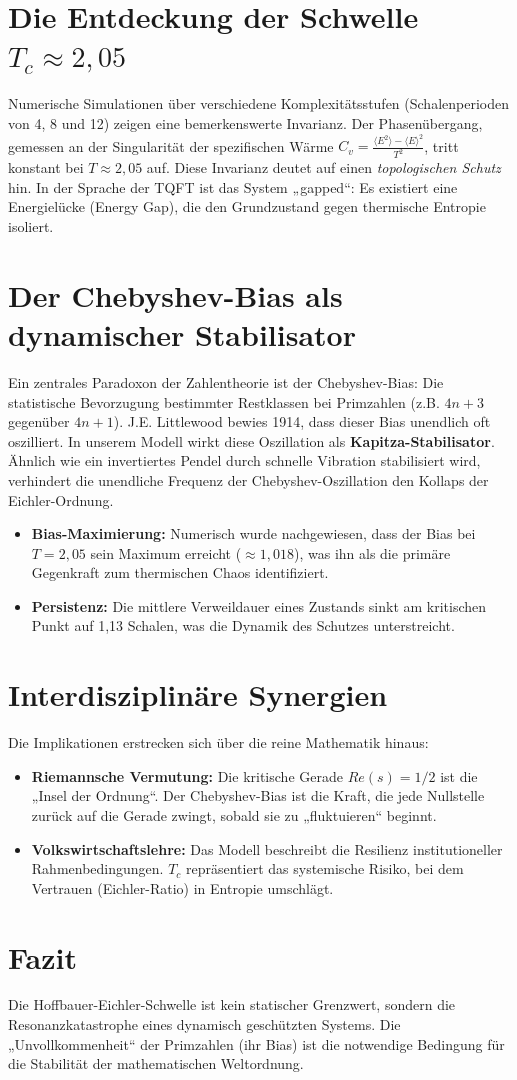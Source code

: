 \documentclass[11pt,a4paper,oneside]{article}
\begin{document}
\section{Die Entdeckung der Schwelle $T_c \approx 2,05$}
Numerische Simulationen über verschiedene Komplexitätsstufen (Schalenperioden von 4, 8 und 12) zeigen eine bemerkenswerte Invarianz. Der Phasenübergang, gemessen an der Singularität der spezifischen Wärme $C_v = \frac{\langle E^2 \rangle - \langle E \rangle^2}{T^2}$, tritt konstant bei $T \approx 2,05$ auf. 
Diese Invarianz deutet auf einen \textit{topologischen Schutz} hin. In der Sprache der TQFT ist das System „gapped“: Es existiert eine Energielücke (Energy Gap), die den Grundzustand gegen thermische Entropie isoliert.

\section{Der Chebyshev-Bias als dynamischer Stabilisator}
Ein zentrales Paradoxon der Zahlentheorie ist der Chebyshev-Bias: Die statistische Bevorzugung bestimmter Restklassen bei Primzahlen (z.B. $4n+3$ gegenüber $4n+1$). J.E. Littlewood bewies 1914, dass dieser Bias unendlich oft oszilliert.
In unserem Modell wirkt diese Oszillation als \textbf{Kapitza-Stabilisator}. Ähnlich wie ein invertiertes Pendel durch schnelle Vibration stabilisiert wird, verhindert die unendliche Frequenz der Chebyshev-Oszillation den Kollaps der Eichler-Ordnung. 
\begin{itemize}
    \item \textbf{Bias-Maximierung:} Numerisch wurde nachgewiesen, dass der Bias bei $T=2,05$ sein Maximum erreicht ($\approx 1,018$), was ihn als die primäre Gegenkraft zum thermischen Chaos identifiziert.
    \item \textbf{Persistenz:} Die mittlere Verweildauer eines Zustands sinkt am kritischen Punkt auf 1,13 Schalen, was die Dynamik des Schutzes unterstreicht.
\end{itemize}

\section{Interdisziplinäre Synergien}
Die Implikationen erstrecken sich über die reine Mathematik hinaus:
\begin{itemize}
    \item \textbf{Riemannsche Vermutung:} Die kritische Gerade $Re(s)=1/2$ ist die „Insel der Ordnung“. Der Chebyshev-Bias ist die Kraft, die jede Nullstelle zurück auf die Gerade zwingt, sobald sie zu „fluktuieren“ beginnt.
    \item \textbf{Volkswirtschaftslehre:} Das Modell beschreibt die Resilienz institutioneller Rahmenbedingungen. $T_c$ repräsentiert das systemische Risiko, bei dem Vertrauen (Eichler-Ratio) in Entropie umschlägt.
\end{itemize}

\section{Fazit}
Die Hoffbauer-Eichler-Schwelle ist kein statischer Grenzwert, sondern die Resonanzkatastrophe eines dynamisch geschützten Systems. Die „Unvollkommenheit“ der Primzahlen (ihr Bias) ist die notwendige Bedingung für die Stabilität der mathematischen Weltordnung.
\end{document}
